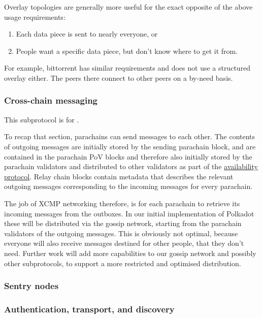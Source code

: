 Overlay topologies are generally more useful for the exact opposite of the
above usage requirements:

\begin{enumerate}
\item Each data piece is sent to nearly everyone, or
\item People want a specific data piece, but don't know where to get it from.
\end{enumerate}

For example, bittorrent has similar requirements and does not use a structured
overlay either. The peers there connect to other peers on a by-need basis.

\subsubsection{Cross-chain messaging} \label{sec:net_crosschain}

This subprotocol is for .

To recap that section, parachains can send messages to each other. The contents
of outgoing messages are initially stored by the sending parachain block, and
are contained in the parachain PoV blocks and therefore also initially stored
by the parachain validators and distributed to other validators as part of the
\hyperref[sec:net_storage]{availability protocol}. Relay chain blocks contain
metadata that describes the relevant outgoing messages corresponding to the
incoming messages for every parachain.

The job of XCMP networking therefore, is for each parachain to retrieve its
incoming messages from the outboxes. In our initial implementation of Polkadot
these will be distributed via the gossip network, starting from the parachain
validators of the outgoing messages. This is obviously not optimal, because
everyone will also receive messages destined for other people, that they don't
need. Further work will add more capabilities to our gossip network and
possibly other subprotocols, to support a more restricted and optimised
distribution.

\subsubsection{Sentry nodes} \label{sec:net_sentry}

\subsubsection{Authentication, transport, and discovery} \label{sec:net_lowlevel}

